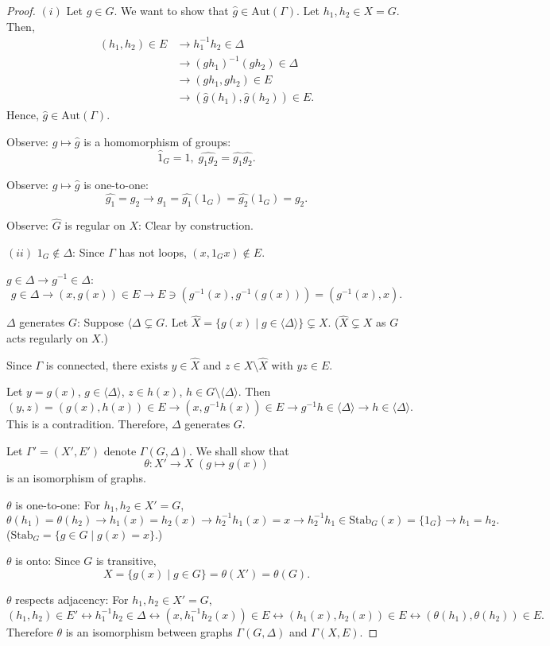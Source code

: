 \documentclass[
]{book}
\theoremstyle{definition}
\theoremstyle{definition}
\theoremstyle{definition}
\theoremstyle{definition}
\theoremstyle{remark}
\begin{document}
\begin{proof}
\((i)\) Let \(g\in G\). We want to show that \(\hat{g}\in \mathrm{Aut}(\Gamma)\). Let \(h_1, h_2\in X = G\). Then,
\begin{align}
(h_1, h_2)\in E & \to h_1^{-1}h_2\in \Delta\\
  & \to (gh_1)^{-1}(gh_2)\in \Delta \\
  & \to (gh_1, gh_2)\in E\\
  & \to (\hat{g}(h_1), \hat{g}(h_2)) \in E.
\end{align}
Hence, \(\hat{g}\in \mathrm{Aut}(\Gamma)\).

Observe: \(g \mapsto \hat{g}\) is a homomorphism of groups:
\[\hat{1}_G = 1, \; \widehat{g_1g_2} = \widehat{g_1}\widehat{g_2}.\]

Observe: \(g \mapsto \hat{g}\) is one-to-one:
\[\widehat{g_1} = \widehat{g_2} \to g_1 = \widehat{g_1}(1_G) = \widehat{g_2}(1_G) = g_2.\]

Observe: \(\hat{G}\) is regular on \(X\): Clear by construction.

\((ii)\) \(1_G\not\in \Delta\): Since \(\Gamma\) has not loops, \((x, 1_Gx) \not\in E\).

\(g\in \Delta \to g^{-1}\in \Delta\):
\[g\in \Delta \to (x, g(x))\in E \to E \ni (g^{-1}(x), g^{-1}(g(x))) = (g^{-1}(x), x).\]

\(\Delta\) generates \(G\): Suppose \(\langle \Delta \subsetneq G\). Let \(\hat{X} = \{g(x)\mid g\in \langle \Delta\rangle\} \subsetneq X\). (\(\hat{X} \subsetneq X\) as \(G\) acts regularly on \(X\).)

Since \(\Gamma\) is connected, there exists \(y\in \hat{X}\) and \(z\in X\setminus \hat{X}\) with \(yz\in E\).

Let \(y = g(x)\), \(g\in \langle \Delta\rangle\), \(z\in h(x)\), \(h\in G\setminus \langle \Delta\rangle\). Then
\[(y,z)=(g(x),h(x))\in E \to (x,g^{-1}h(x))\in E \to g^{-1}h\in \langle \Delta \rangle \to h\in \langle \Delta \rangle. \]
This is a contradition. Therefore, \(\Delta\) generates \(G\).

Let \(\Gamma' = (X', E')\) denote \(\Gamma(G, \Delta)\). We shall show that
\[\theta: X' \to X \; (g\mapsto g(x))\]
is an isomorphism of graphs.

\(\theta\) is one-to-one: For \(h_1, h_2\in X' = G\),
\[\theta(h_1)=\theta(h_2) \to h_1(x) = h_2(x) \to h_2^{-1}h_1(x)=x \to h_2^{-1}h_1\in \mathrm{Stab}_G(x) = \{1_G\} \to h_1 = h_2.\]
(\(\mathrm{Stab}_G = \{g\in G\mid g(x) = x\}\).)

\(\theta\) is onto: Since \(G\) is transitive,
\[X = \{g(x)\mid g\in G\} = \theta(X') = \theta(G).\]

\(\theta\) respects adjacency: For \(h_1, h_2\in X' = G\),
\[(h_1,h_2)\in E' \leftrightarrow h_1^{-1}h_2\in \Delta \leftrightarrow (x, h_1^{-1}h_2(x))\in E \leftrightarrow (h_1(x),h_2(x))\in E \leftrightarrow (\theta(h_1), \theta(h_2))\in E.\]
Therefore \(\theta\) is an isomorphism between graphs \(\Gamma(G, \Delta)\) and \(\Gamma(X, E)\).
\end{proof}
\end{document}
